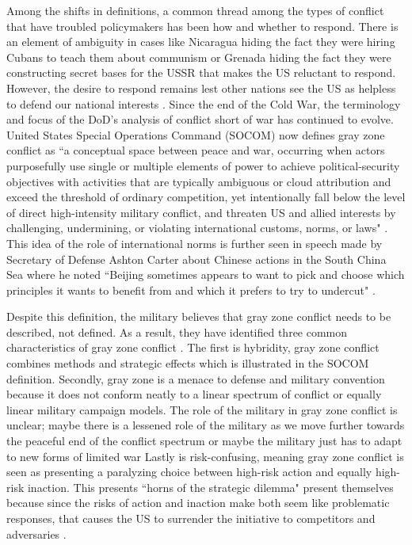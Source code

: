 \documentclass[12pt,letterpaper]{article}
\begin{document}
		Among the shifts in definitions, a common thread among the types of conflict that have troubled policymakers has been how and whether to respond. There is an element of ambiguity in cases like Nicaragua hiding the fact they were hiring Cubans to teach them about communism or Grenada hiding the fact they were constructing secret bases for the USSR that makes the US reluctant to respond. However, the desire to respond remains lest other nations see the US as helpless to defend our national interests  \citep{schultz_lowintensitywarfarechallenge_1986}. Since the end of the Cold War, the terminology and focus of the DoD's analysis of conflict short of war has continued to evolve. United States Special Operations Command (SOCOM) now defines gray zone conflict as ``a conceptual space between peace and war, occurring when actors purposefully use single or multiple elements of power to achieve political-security objectives with activities that are typically ambiguous or cloud attribution and exceed the threshold of ordinary competition, yet intentionally fall below the level of direct high-intensity military conflict, and threaten US and allied interests by challenging, undermining, or violating international customs, norms, or laws"  \citep{votel_unconventionalwarfaregray_2016}. This idea of the role of international norms is further seen in speech made by Secretary of Defense Ashton Carter about Chinese actions in the South China Sea where he noted ``Beijing sometimes appears to want to pick and choose which principles it wants to benefit from and which it prefers to try to undercut" \citep{carter_remarksfuturerebalance_2016}.
		
		Despite this definition, the military believes that gray zone conflict needs to be described, not defined. As a result, they have identified three common characteristics of gray zone conflict \citep{freier_outplayedregainingstrategic_2016, maxwell_grayzonesubject_2016}. The first is hybridity, gray zone conflict combines methods and strategic effects which is illustrated in the SOCOM definition. Secondly, gray zone is a menace to defense and military convention because it does not conform neatly to a linear spectrum of conflict or equally linear military campaign models. The role of the military in gray zone conflict is unclear; maybe there is a lessened role of the military as we move further towards the peaceful end of the conflict spectrum or maybe the military just has to adapt to new forms of limited war Lastly is risk-confusing, meaning gray zone conflict is seen as presenting a paralyzing choice between high-risk action and equally high-risk inaction. This presents ``horns of the strategic dilemma" present themselves because since the risks of action and inaction make both seem like problematic responses, that causes the US to surrender the initiative to competitors and adversaries  \citep{maxwell_grayzonesubject_2016}.
		
\end{document}

